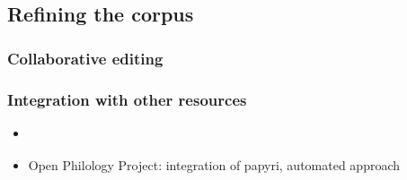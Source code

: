 
\subsection{Refining the corpus}
\label{sec:refiningcorpus}

\subsubsection{Collaborative editing}
\label{sec:collaborative}



\subsubsection{Integration with other resources}
\label{sec:linking}
\begin{itemize}
\item \cite{bammanpbml2008,bammantlt8,bammancrane2011}
\item Open Philology Project: integration of papyri, automated approach
\end{itemize}